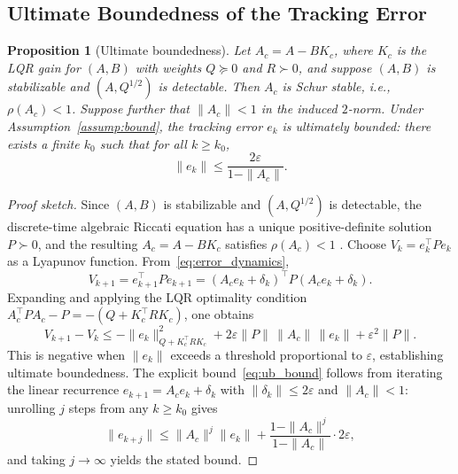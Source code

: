 \documentclass[journal]{IEEEtran}
\newtheorem{proposition}{Proposition}
\begin{document}
\subsection{Ultimate Boundedness of the Tracking Error}

\begin{proposition}[Ultimate boundedness]
\label{prop:ub}
Let $A_c = A - BK_c$, where $K_c$ is the LQR gain for $(A,B)$ with weights $Q \succeq 0$ and $R \succ 0$, and suppose $(A,B)$ is stabilizable and $(A,Q^{1/2})$ is detectable. Then $A_c$ is Schur stable, i.e., $\rho(A_c) < 1$. Suppose further that $\|A_c\| < 1$ in the induced $2$-norm. Under Assumption~\ref{assump:bound}, the tracking error $e_k$ is ultimately bounded: there exists a finite $k_0$ such that for all $k \geq k_0$,
\begin{equation}
    \|e_k\| \leq \frac{2\varepsilon}{1 - \|A_c\|}.
    \label{eq:ub_bound}
\end{equation}
\end{proposition}

\begin{proof}[Proof sketch]
Since $(A,B)$ is stabilizable and $(A,Q^{1/2})$ is detectable, the discrete-time algebraic Riccati equation has a unique positive-definite solution $P \succ 0$, and the resulting $A_c = A - BK_c$ satisfies $\rho(A_c) < 1$ \cite{korda2018linear}. Choose $V_k = e_k^\top P e_k$ as a Lyapunov function. From~\eqref{eq:error_dynamics},
\begin{equation}
    V_{k+1} = e_{k+1}^\top P e_{k+1} = (A_c e_k + \delta_k)^\top P (A_c e_k + \delta_k).
\end{equation}
Expanding and applying the LQR optimality condition $A_c^\top P A_c - P = -(Q + K_c^\top R K_c)$, one obtains
\begin{equation}
    V_{k+1} - V_k \leq -\|e_k\|_{Q+K_c^\top R K_c}^2 + 2\varepsilon \|P\|\,\|A_c\|\,\|e_k\| + \varepsilon^2 \|P\|.
\end{equation}
This is negative when $\|e_k\|$ exceeds a threshold proportional to $\varepsilon$, establishing ultimate boundedness. The explicit bound~\eqref{eq:ub_bound} follows from iterating the linear recurrence $e_{k+1} = A_c e_k + \delta_k$ with $\|\delta_k\| \leq 2\varepsilon$ and $\|A_c\| < 1$: unrolling $j$ steps from any $k \geq k_0$ gives
\begin{equation}
    \|e_{k+j}\| \leq \|A_c\|^j \|e_k\| + \frac{1 - \|A_c\|^j}{1 - \|A_c\|}\cdot 2\varepsilon,
\end{equation}
and taking $j\to\infty$ yields the stated bound.
\end{proof}
\end{document}
